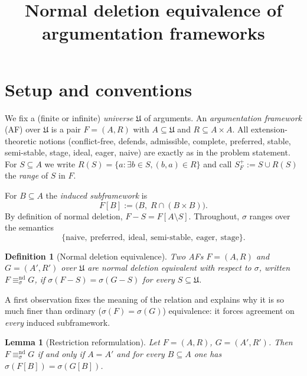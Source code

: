\documentclass{amsart}
\newtheorem{lemma}[theorem]{Lemma}
\newtheorem{definition}[theorem]{Definition}
\theoremstyle{remark}
\begin{document}
\title{Normal deletion equivalence of argumentation frameworks}
\maketitle

\section{Setup and conventions}

We fix a (finite or infinite) \emph{universe} $\mathfrak{U}$ of arguments.  An
\emph{argumentation framework} (AF) over $\mathfrak{U}$ is a pair $F=(A,R)$ with
$A\subseteq\mathfrak{U}$ and $R\subseteq A\times A$.  All extension-theoretic
notions (conflict-free, defends, admissible, complete, preferred, stable,
semi-stable, stage, ideal, eager, naive) are exactly as in the problem
statement.  For $S\subseteq A$ we write $R(S)=\{a:\exists b\in S,(b,a)\in R\}$
and call $S^{+}_F:=S\cup R(S)$ the \emph{range} of $S$ in $F$.

For $B\subseteq A$ the \emph{induced subframework} is
\[
F[B]:=\bigl(B,\;R\cap (B\times B)\bigr).
\]
By definition of normal deletion, $F-S=F[A\setminus S]$.  Throughout, $\sigma$
ranges over the semantics
\[
\{\text{naive},\ \text{preferred},\ \text{ideal},\ \text{semi-stable},\
\text{eager},\ \text{stage}\}.
\]

\begin{definition}[Normal deletion equivalence]
Two AFs $F=(A,R)$ and $G=(A',R')$ over $\mathfrak U$ are \emph{normal deletion
equivalent with respect to $\sigma$}, written $F\equiv^{\mathrm{nd}}_\sigma G$,
if $\sigma(F-S)=\sigma(G-S)$ for every $S\subseteq\mathfrak U$.
\end{definition}

A first observation fixes the meaning of the relation and explains why it is so
much finer than ordinary ($\sigma(F)=\sigma(G)$) equivalence: it forces
agreement on \emph{every} induced subframework.

\begin{lemma}[Restriction reformulation]\label{lem:reform}
Let $F=(A,R)$, $G=(A',R')$.  Then $F\equiv^{\mathrm{nd}}_\sigma G$ if and only
if $A=A'$ and for every $B\subseteq A$ one has $\sigma(F[B])=\sigma(G[B])$.
\end{lemma}
\end{document}
